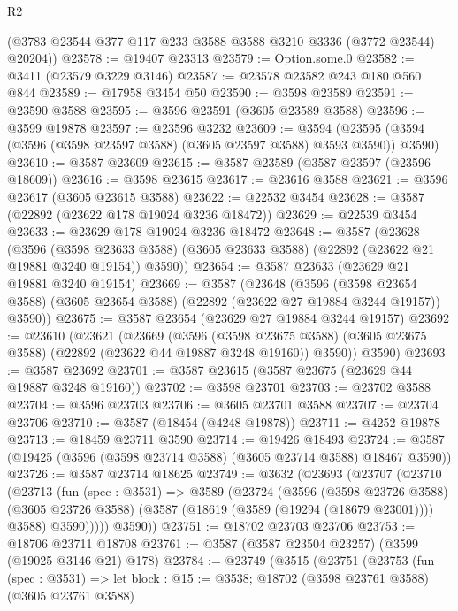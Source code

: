 \begin{lexlean}{R2}
\begin{coremodule}
      (@3783 @23544 @377 @117 @233 @3588 @3588 @3210 @3336 (@3772 @23544) @20204))
@23578 := @19407 @23313
@23579 := Option.some.{0}
@23582 := @3411 (@23579 @3229 @3146)
@23587 := @23578 @23582 @243 @180 @560 @844
@23589 := @17958 @3454 @50
@23590 := @3598 @23589
@23591 := @23590 @3588
@23595 := @3596 @23591 (@3605 @23589 @3588)
@23596 := @3599 @19878
@23597 := @23596 @3232
@23609 := @3594 (@23595 (@3594 (@3596 (@3598 @23597 @3588) (@3605 @23597 @3588) @3593 @3590)) @3590)
@23610 := @3587 @23609
@23615 := @3587 @23589 (@3587 @23597 (@23596 @18609))
@23616 := @3598 @23615
@23617 := @23616 @3588
@23621 := @3596 @23617 (@3605 @23615 @3588)
@23622 := @22532 @3454
@23628 := @3587 (@22892 (@23622 @178 @19024 @3236 @18472))
@23629 := @22539 @3454
@23633 := @23629 @178 @19024 @3236 @18472
@23648 := @3587
    (@23628
      (@3596
        (@3598 @23633 @3588)
        (@3605 @23633 @3588)
        (@22892 (@23622 @21 @19881 @3240 @19154))
        @3590))
@23654 := @3587 @23633 (@23629 @21 @19881 @3240 @19154)
@23669 := @3587
    (@23648
      (@3596
        (@3598 @23654 @3588)
        (@3605 @23654 @3588)
        (@22892 (@23622 @27 @19884 @3244 @19157))
        @3590))
@23675 := @3587 @23654 (@23629 @27 @19884 @3244 @19157)
@23692 := @23610
    (@23621
      (@23669
        (@3596
          (@3598 @23675 @3588)
          (@3605 @23675 @3588)
          (@22892 (@23622 @44 @19887 @3248 @19160))
          @3590))
      @3590)
@23693 := @3587 @23692
@23701 := @3587 @23615 (@3587 @23675 (@23629 @44 @19887 @3248 @19160))
@23702 := @3598 @23701
@23703 := @23702 @3588
@23704 := @3596 @23703
@23706 := @3605 @23701 @3588
@23707 := @23704 @23706
@23710 := @3587 (@18454 (@4248 @19878))
@23711 := @4252 @19878
@23713 := @18459 @23711 @3590
@23714 := @19426 @18493
@23724 := @3587 (@19425 (@3596 (@3598 @23714 @3588) (@3605 @23714 @3588) @18467 @3590))
@23726 := @3587 @23714 @18625
@23749 := @3632
    (@23693
      (@23707
        (@23710
          (@23713
            (fun (spec : @3531) =>
            @3589
              (@23724
                (@3596
                  (@3598 @23726 @3588)
                  (@3605 @23726 @3588)
                  (@3587 (@18619 (@3589 (@19294 (@18679 @23001)))) @3588)
                  @3590)))))
        @3590))
@23751 := @18702 @23703 @23706
@23753 := @18706 @23711 @18708
@23761 := @3587 (@3587 @23504 @23257) (@3599 (@19025 @3146 @21) @178)
@23784 := @23749
    (@3515
      (@23751
        (@23753
          (fun (spec : @3531) =>
          let block : @15 := @3538;
          @18702
            (@3598 @23761 @3588)
            (@3605 @23761 @3588)

\end{coremodule}
\end{lexlean}
